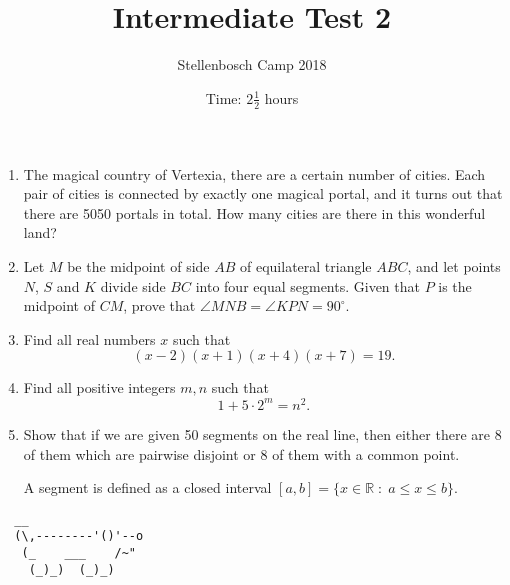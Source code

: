 \documentclass{article}
\title{Intermediate Test 2}
\author{Stellenbosch Camp 2018}
\date{Time: $2\frac{1}{2}$ hours}
\begin{document}
\maketitle

\begin{enumerate}[1.]

\item %
The magical country of Vertexia, there are a certain number of cities. Each pair of cities is connected by exactly one magical portal, and it turns out that there are 5050 portals in total. How many cities are there in this wonderful land?

\vspace{12pt}
\item 
Let $M$ be the midpoint of side $AB$ of equilateral triangle $ABC$, and let points $N$, $S$ and $K$ divide side $BC$ into four equal segments. Given that $P$ is the midpoint of $CM$, prove that $\angle MNB = \angle KPN = 90^\circ$.

\vspace{12pt}
\item %
Find all real numbers $x$ such that \[ (x-2)(x+1)(x+4)(x+7) = 19. \]

\vspace{12pt}
\item %
Find all positive integers $m, n$ such that \[ 1 + 5 \cdot 2^m = n^2. \]

\vspace{12pt}
\item %
Show that if we are given 50 segments on the real line, then either there are 8 of them which are pairwise disjoint or 8 of them with a common point. 

A segment is defined as a closed interval $[a, b] = \{x \in \mathbb{R} \;:\; a \leq x \leq b \}$.

\end{enumerate}


\vspace{12pt}
\begin{center}
\begin{BVerbatim}
  __
  (\,--------'()'--o
   (_    ___    /~"
    (_)_)  (_)_)
\end{BVerbatim}
\end{center}
\end{document}
